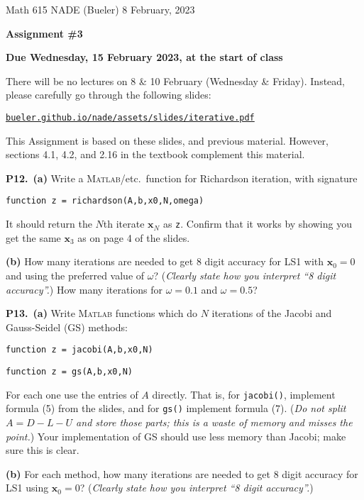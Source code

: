 \documentclass[12pt]{amsart}
\newcommand{\bx}{\mathbf{x}}
\newcommand{\prob}[1]{\bigskip\noindent\textbf{#1.}\quad }
\newcommand{\epart}[1]{\medskip\noindent\textbf{(#1)}\quad }
\newcommand{\ppart}[1]{\,\textbf{(#1)}\quad }
\newcommand{\Matlab}{\textsc{Matlab}\xspace}
\begin{document}
\scriptsize \noindent Math 615 NADE (Bueler) \hfill 8 February, 2023
\normalsize

\medskip\bigskip

\Large\centerline{\textbf{Assignment \#3}}
\large
\bigskip

\centerline{\textbf{Due Wednesday, 15 February 2023, at the start of class}}
\bigskip
\normalsize

\thispagestyle{empty}

\bigskip
There will be no lectures on 8 \& 10 February (Wednesday \& Friday).  Instead, please carefully go through the following slides:

\medskip
\centerline{\href{http://bueler.github.io/nade/assets/slides/iterative.pdf}{\texttt{bueler.github.io/nade/assets/slides/iterative.pdf}}}

\medskip
\noindent  This Assignment is based on these slides, and previous material.  However, sections 4.1, 4.2, and 2.16 in the textbook complement this material.

\prob{P12}  \ppart{a} Write a \Matlab/etc.~function for Richardson iteration, with signature

\bigskip
\centerline{\texttt{function z = richardson(A,b,x0,N,omega)}}

\bigskip
\noindent It should return the $N$th iterate $\bx_N$ as \texttt{z}.  Confirm that it works by showing you get the same $\bx_3$ as on page 4 of the slides.

\epart{b}  How many iterations are needed to get 8 digit accuracy for LS1 with $\bx_0=0$ and using the preferred value of $\omega$?  (\emph{Clearly state how you interpret ``8 digit accuracy''.})  How many iterations for $\omega = 0.1$ and $\omega = 0.5$?


\prob{P13}  \ppart{a}  Write \Matlab functions which do $N$ iterations of the Jacobi and Gauss-Seidel (GS) methods:

\medskip
\centerline{\texttt{function z = jacobi(A,b,x0,N)}}

\centerline{\texttt{function z = gs(A,b,x0,N)}}

\medskip
\noindent For each one use the entries of $A$ directly.  That is, for \texttt{jacobi()}, implement formula (5) from the slides, and for \texttt{gs()} implement formula (7).  (\emph{Do not split $A=D-L-U$ and store those parts; this is a waste of memory and misses the point.})  Your implementation of GS should use less memory than Jacobi; make sure this is clear. 

\epart{b}  For each method, how many iterations are needed to get 8 digit accuracy for LS1 using $\bx_0=0$?  (\emph{Clearly state how you interpret ``8 digit accuracy''.})
\end{document}
